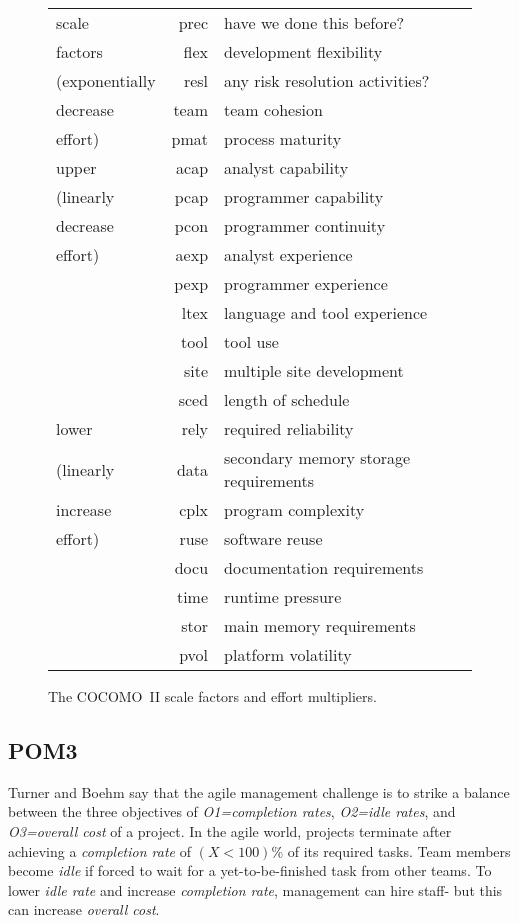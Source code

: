 \begin{wrapfigure}{r}{2in}
{\scriptsize
\begin{tabular}{l|r@{:~}p{1.5in}|}\cline{2-3}
scale   &prec & have we done this before?\\
factors &flex & development flexibility \\
(exponentially        &resl & any risk resolution activities?\\
 decrease       &team &  team cohesion\\
 effort)       &pmat & process maturity\\\hline
upper  &acap & analyst capability\\
(linearly       &pcap & programmer capability\\
 decrease      &pcon & programmer continuity\\
effort)       &aexp &  analyst experience\\
       &pexp &  programmer experience\\
       &ltex &  language and tool experience\\
       &tool &  tool use\\
       &site &  multiple site development\\
       &sced & length of schedule   \\\hline
lower &rely &    required reliability  \\
(linearly      &data &   secondary memory  storage requirements\\
increase      &cplx &  program complexity\\
effort)      &ruse &  software reuse\\
      &docu &   documentation requirements\\
      &time &   runtime pressure\\
      &stor &   main memory requirements\\
     &pvol &    platform volatility  \\\cline{2-3}
\end{tabular}}
\caption{{
The COCOMO~II scale factors and effort multipliers.}}\label{fig:emsf2}
\end{wrapfigure}


\subsection{POM3}
Turner and Boehm say that the agile
management challenge is to strike a balance between the three objectives
of {\em O1=completion rates},
{\em O2=idle rates},
 and {\em O3=overall cost} of a project.
In the agile world, projects terminate after achieving a 
{\em completion rate} of   $(X<100)$\% of its required tasks.
Team members  become
{\em idle} if forced to wait for a yet-to-be-finished task from other teams. 
To lower {\em idle rate} and  
increase {\em completion rate}, management can hire staff- but this
can increase  {\em overall cost}.

